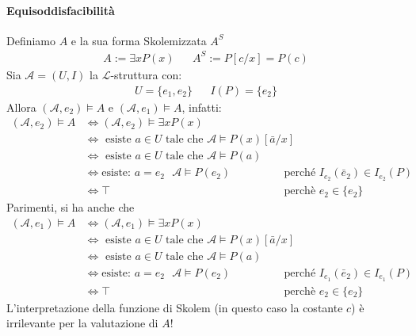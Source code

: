 \paragraph{Equisoddisfacibilità}
Definiamo $A$ e la sua forma Skolemizzata $A^S$
\begin{align*}
A := \exists x P(x) && 
A^S := P[c/x] = P(c)
\end{align*}
Sia $\mathscr{A} = (U, I)$ la $\mathscr{L}$-struttura con: 
\begin{align*}
U    = \{e_1,e_2\} &&
I(P) = \{e_2\} 
\end{align*}
Allora $(\mathscr{A}, e_2) \models A$ e $(\mathscr{A}, e_1) \models A$, infatti: 
\begin{align*}
  (\mathscr{A}, e_2) \models A &\iff (\mathscr{A}, e_2) \models \exists x P(x)\\
    &\iff \text{ esiste } a \in U \text{ tale che } \mathscr{A} \models P(x)[\bar{a}/x] \\
    &\iff \text{ esiste } a \in U \text{ tale che } \mathscr{A} \models P(a) \\
    &\iff \text{esiste: } a = e_2 ~~~ \mathscr{A} \models P(e_2) & \text{perché }I_{e_2}(\bar e_2) \in I_{e_2}(P) \\
    & \iff \top & \text{perchè } e_2 \in \{e_2\}
\end{align*}
Parimenti, si ha anche che 
\begin{align*}
  (\mathscr{A}, e_1) \models A &\iff (\mathscr{A}, e_1) \models \exists x P(x)\\
      &\iff \text{ esiste } a \in U \text{ tale che } \mathscr{A} \models P(x)[\bar{a}/x] \\
    &\iff \text{ esiste } a \in U \text{ tale che } \mathscr{A} \models P(a) \\
    &\iff \text{esiste: } a = e_2 ~~~ \mathscr{A} \models P(e_2) & \text{perché }I_{e_1}(\bar e_2) \in I_{e_1}(P) \\
    & \iff \top & \text{perchè } e_2 \in \{e_2\}
\end{align*}
L'interpretazione della funzione di Skolem (in questo caso la costante $c$) è irrilevante per la valutazione di $A$!

